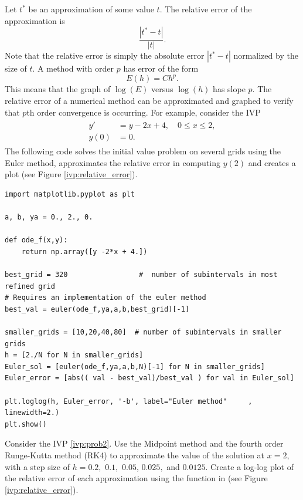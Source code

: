 Let $t^*$ be an approximation of some value $t$. The relative error of the approximation is 
\[ \frac{|t^*-t|}{|t|}.
\]
Note that the relative error is simply the absolute error $|t^*-t|$ normalized by the size of $t$.  A method with order $p$ has error of the form 
\[E(h) = C h^p. \]
This means that the graph of $\log (E)$ versus $\log(h)$ has slope $p$.  
The relative error of a numerical method can be approximated and graphed to verify that $p$th order convergence is occurring. For example, consider the IVP
 \begin{align}
 	\begin{split}
 y' &= y - 2x + 4,\quad 0 \leq x \leq 2, \\
 y(0) &= 0.
 	\end{split} \label{ivp:prob2}
 \end{align}
The following code solves the initial value problem on several grids using the Euler method, approximates the relative error in computing $y(2)$ and creates a plot (see Figure \ref{ivp:relative_error}).

\begin{lstlisting}
import matplotlib.pyplot as plt

a, b, ya = 0., 2., 0.

def ode_f(x,y):
	return np.array([y -2*x + 4.])
	
best_grid = 320					#  number of subintervals in most refined grid
# Requires an implementation of the euler method
best_val = euler(ode_f,ya,a,b,best_grid)[-1]  

smaller_grids = [10,20,40,80]  # number of subintervals in smaller grids
h = [2./N for N in smaller_grids]
Euler_sol = [euler(ode_f,ya,a,b,N)[-1] for N in smaller_grids]
Euler_error = [abs(( val - best_val)/best_val ) for val in Euler_sol]
	
plt.loglog(h, Euler_error, '-b', label="Euler method"	  , linewidth=2.)
plt.show()

\end{lstlisting}


\begin{problem} Consider the IVP \eqref{ivp:prob2}.
Use the Midpoint method and the fourth order Runge-Kutta method (RK4) to approximate the value of the solution at $x = 2$, with a step size of $h = 0.2,$ $ 0.1,$ $0.05 $, $0.025,$ and $0.0125.$ 
Create a log-log plot of the relative error of each approximation using the  function in  (see Figure \ref{ivp:relative_error}).
\end{problem}

